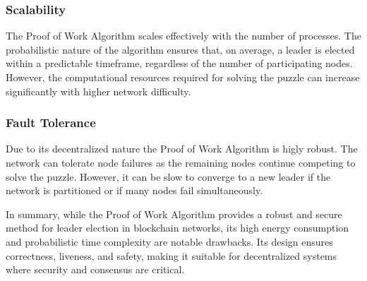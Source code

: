 \subsubsection{Scalability}

The Proof of Work Algorithm scales effectively with the number of processes. The probabilistic nature of the algorithm ensures that, on average, a leader is elected within a predictable timeframe, regardless of the number of participating nodes. However, the computational resources required for solving the puzzle can increase significantly with higher network difficulty.

\subsubsection{Fault Tolerance}
Due to its decentralized nature the Proof of Work Algorithm is higly robust. The network can tolerate node failures as the remaining nodes continue competing to solve the puzzle. However, it can be slow to converge to a new leader if the network is partitioned or if many nodes fail simultaneously.


In summary, while the Proof of Work Algorithm provides a robust and secure method for leader election in blockchain networks, its high energy consumption and probabilistic time complexity are notable drawbacks. Its design ensures correctness, liveness, and safety, making it suitable for decentralized systems where security and consensus are critical.




